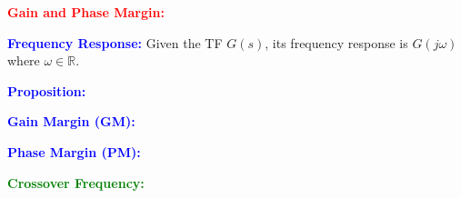 \documentclass[5pt]{extarticle} %
\begin{document}
\begin{paracol}{3}
{    \textcolor{red}{\textbf{Gain and Phase Margin:}} 

    \textcolor{blue}{\textbf{Frequency Response:}} Given the TF $G(s)$, its frequency response is $G(j \omega)$ where $\omega \in \mathbb{R}$. 

    \textcolor{blue}{\textbf{Proposition:}} 

    \textcolor{blue}{\textbf{Gain Margin (GM):}} 

    \textcolor{blue}{\textbf{Phase Margin (PM):}}

    \textcolor{green}{\textbf{Crossover Frequency:}}



        }
\end{paracol}
\end{document}
